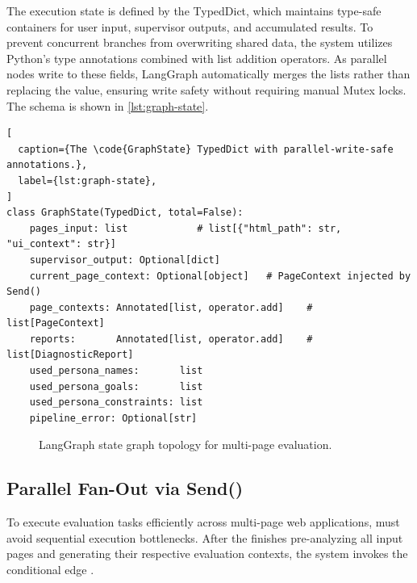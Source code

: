 The execution state is defined by the  TypedDict, which maintains type-safe containers for user input, supervisor outputs, and accumulated results. To prevent concurrent branches from overwriting shared data, the system utilizes Python's  type annotations combined with list addition operators. As parallel nodes write to these fields, LangGraph automatically merges the lists rather than replacing the value, ensuring write safety without requiring manual Mutex locks. The schema is shown in \cref{lst:graph-state}.

\begin{lstlisting}[
  caption={The \code{GraphState} TypedDict with parallel-write-safe annotations.},
  label={lst:graph-state},
]
class GraphState(TypedDict, total=False):
    pages_input: list            # list[{"html_path": str, "ui_context": str}]
    supervisor_output: Optional[dict]
    current_page_context: Optional[object]   # PageContext injected by Send()
    page_contexts: Annotated[list, operator.add]    # list[PageContext]
    reports:       Annotated[list, operator.add]    # list[DiagnosticReport]
    used_persona_names:       list
    used_persona_goals:       list
    used_persona_constraints: list
    pipeline_error: Optional[str]
\end{lstlisting}

\begin{figure}[htbp]
  \centering
  \caption{LangGraph state graph topology for multi-page evaluation.}
  \label{fig:langgraph-topology}
\end{figure}

\subsection{Parallel Fan-Out via Send()}
\label{sec:fan-out}

To execute evaluation tasks efficiently across multi-page web applications, \versimux{} must avoid sequential execution bottlenecks. After the  finishes pre-analyzing all input pages and generating their respective evaluation contexts, the system invokes the conditional edge . 

